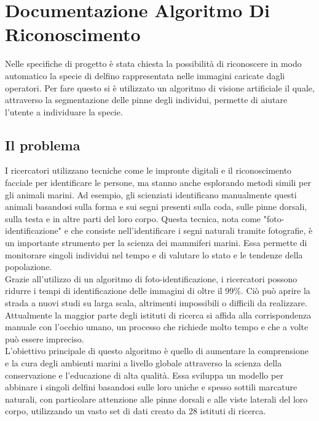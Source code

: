 \documentclass[a4paper,final,12pt]{report}
\begin{document}
\chapter{Documentazione Algoritmo Di Riconoscimento}
Nelle specifiche di progetto è stata chiesta la possibilità di riconoscere in modo automatico la specie di delfino rappresentata nelle immagini caricate dagli operatori. Per fare questo si è utilizzato un algoritmo di visione artificiale il quale, attraverso la segmentazione delle pinne degli individui, permette di aiutare l'utente a individuare la specie.

\section{Il problema}
I ricercatori utilizzano tecniche come le impronte digitali e il riconoscimento facciale per identificare le persone, ma stanno anche esplorando metodi simili per gli animali marini. Ad esempio, gli scienziati identificano manualmente questi animali basandosi sulla forma e sui segni presenti sulla coda, sulle pinne dorsali, sulla testa e in altre parti del loro corpo. Questa tecnica, nota come "foto-identificazione" e che consiste nell'identificare i segni naturali tramite fotografie, è un importante strumento per la scienza dei mammiferi marini. Essa permette di monitorare singoli individui nel tempo e di valutare lo stato e le tendenze della popolazione.\\

Grazie all'utilizzo di un algoritmo di foto-identificazione, i ricercatori possono ridurre i tempi di identificazione delle immagini di oltre il 99\%. Ciò può aprire la strada a nuovi studi su larga scala, altrimenti impossibili o difficili da realizzare. Attualmente la maggior parte degli istituti di ricerca si affida alla corrispondenza manuale con l'occhio umano, un processo che richiede molto tempo e che a volte può essere impreciso.\\

L'obiettivo principale di questo algoritmo è quello di aumentare la comprensione e la cura degli ambienti marini a livello globale attraverso la scienza della conservazione e l'educazione di alta qualità. Essa sviluppa un modello per abbinare i singoli delfini basandosi sulle loro uniche e spesso sottili marcature naturali, con particolare attenzione alle pinne dorsali e alle viste laterali del loro corpo, utilizzando un vasto set di dati creato da 28 istituti di ricerca.\\
\end{document}
